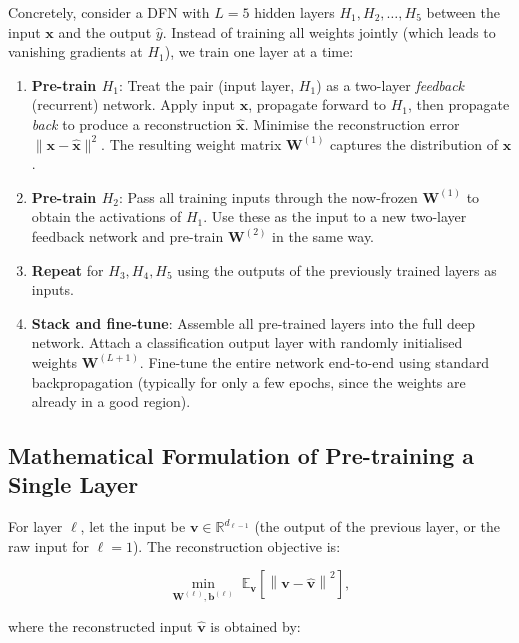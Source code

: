 \documentclass[12pt,a4paper]{article}
\newcommand{\W}{\mathbf{W}}
\newcommand{\x}{\mathbf{x}}
\begin{document}
Concretely, consider a DFN with $L = 5$ hidden layers
$H_1, H_2, \ldots, H_5$ between the input $\x$ and the output $\hat{y}$.
Instead of training all weights jointly (which leads to vanishing gradients
at $H_1$), we train one layer at a time:

\begin{enumerate}[leftmargin=*, label=\textbf{Step \arabic*:}]
  \item \textbf{Pre-train $H_1$}: Treat the pair (input layer, $H_1$) as a
        two-layer \emph{feedback} (recurrent) network.  Apply input $\x$,
        propagate forward to $H_1$, then propagate \emph{back} to produce a
        reconstruction $\hat{\x}$.  Minimise the reconstruction error
        $\|\x - \hat{\x}\|^2$.  The resulting weight matrix $\W^{(1)}$
        captures the distribution of $\x$.
  \item \textbf{Pre-train $H_2$}: Pass all training inputs through the
        now-frozen $\W^{(1)}$ to obtain the activations of $H_1$.  Use
        these as the input to a new two-layer feedback network and pre-train
        $\W^{(2)}$ in the same way.
  \item \textbf{Repeat} for $H_3, H_4, H_5$ using the outputs of the
        previously trained layers as inputs.
  \item \textbf{Stack and fine-tune}: Assemble all pre-trained layers into the
        full deep network.  Attach a classification output layer with randomly
        initialised weights $\W^{(L+1)}$.  Fine-tune the entire network
        end-to-end using standard backpropagation (typically for only a few
        epochs, since the weights are already in a good region).
\end{enumerate}

\subsection{Mathematical Formulation of Pre-training a Single Layer}

For layer $\ell$, let the input be $\mathbf{v} \in \mathbb{R}^{d_{\ell-1}}$
(the output of the previous layer, or the raw input for $\ell = 1$).  The
reconstruction objective is:

\begin{equation}
  \min_{\W^{(\ell)}, \mathbf{b}^{(\ell)}}
  \; \mathbb{E}_{\mathbf{v}}\!\left[
    \left\| \mathbf{v} - \hat{\mathbf{v}} \right\|^2
  \right],
  \label{eq:recon}
\end{equation}

where the reconstructed input $\hat{\mathbf{v}}$ is obtained by:
\end{document}
